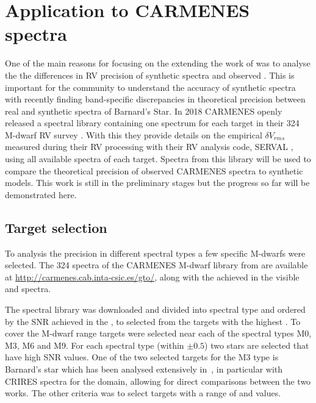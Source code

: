 
\section{Application to {CARMENES} spectra}

One of the main reasons for focusing on the extending the work of\citet{figueira_radial_2016} was to analyse the the differences in {RV} precision of synthetic spectra and observed \nir{}.
This is important for the community to understand the accuracy of synthetic spectra with \citet{artigau_optical_2018} recently finding band-specific discrepancies in theoretical precision between real and synthetic spectra of Barnard's Star.
In 2018 CARMENES openly released a spectral library containing one spectrum for each target in their 324 M-dwarf {RV} survey \citet{reiners_carmenes_2018}.
With this they provide details on the empirical \(\delta V_{rms}\) measured during their RV processing with their RV analysis code, {SERVAL} \citep{zechmeister_spectrum_2018}, using all available spectra of each target.
Spectra from this library will be used to compare the theoretical precision of observed CARMENES spectra to synthetic models.
This work is still in the preliminary stages but the progress so far will be demonstrated here.


\subsection{Target selection}
To analysis the precision in different spectral types a few specific M-dwarfs were selected.
The 324 spectra of the {CARMENES} M-dwarf library from \citet{reiners_carmenes_2018} are available at \href{http://carmenes.cab.inta-csic.es/gto/}{http://carmenes.cab.inta-csic.es/gto/}, along with the achieved \snr{} in the visible and \nir{} spectra.

The spectral library was downloaded and divided into spectral type and ordered by the {SNR} achieved in the \nir{}, to selected from the targets with the highest \snr{}.
To cover the M-dwarf range targets were selected near each of the spectral types M0, M3, M6 and M9.
For each spectral type (within $\pm0.5$) two stars are selected that have high {SNR} values.
One of the two selected targets for the M3 type is Barnard's star which has been analysed extensively in~\citet{artigau_optical_2018}, in particular with CRIRES spectra for the \nir{} domain, allowing for direct comparisons between the two works.
The other criteria was to select targets with a range of \Logg and \feh{} values.

